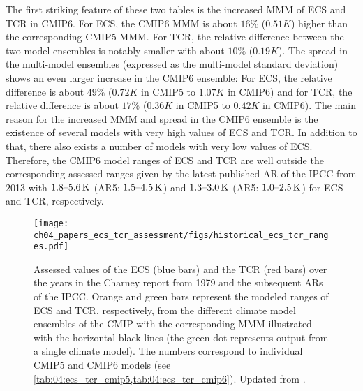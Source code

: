 The first striking feature of these two tables is the increased \ac{MMM} of
\ac{ECS} and \ac{TCR} in \acs{CMIP}6. For \ac{ECS}, the \acs{CMIP}6 \ac{MMM} is
about $16 \unit{\%}$ ($0.51 \unit{K}$) higher than the corresponding
\acs{CMIP}5 \ac{MMM}. For \ac{TCR}, the relative difference between the two
model ensembles is notably smaller with about $10 \unit{\%}$ ($0.19 \unit{K}$).
The spread in the multi-model ensembles (expressed as the multi-model standard
deviation) shows an even larger increase in the \acs{CMIP}6 ensemble: For
\ac{ECS}, the relative difference is about $49 \unit{\%}$ ($0.72 \unit{K}$ in
\acs{CMIP}5 to $1.07 \unit{K}$ in \acs{CMIP}6) and for \ac{TCR}, the relative
difference is about $17 \unit{\%}$ ($0.36 \unit{K}$ in \acs{CMIP}5 to $0.42
\unit{K}$ in \acs{CMIP}6). The main reason for the increased \ac{MMM} and
spread in the \acs{CMIP}6 ensemble is the existence of several models with very
high values of \ac{ECS} and \ac{TCR}. In addition to that, there also exists a
number of models with very low values of \ac{ECS}. Therefore, the \ac{CMIP}6
model ranges of \ac{ECS} and \ac{TCR} are well outside the corresponding
assessed ranges given by the latest published \acl{AR} of the \ac{IPCC} from
2013 \autocite{Stocker2013} with $\range{1.8}{5.6} \unit{K}$ (\acs{AR}5:
$\range{1.5}{4.5} \unit{K}$) and  $\range{1.3}{3.0} \unit{K}$ (\acs{AR}5:
$\range{1.0}{2.5} \unit{K}$) for \ac{ECS} and \ac{TCR}, respectively.

\begin{figure}[t]
  \centering
  \texttt{[image: 
    ch04\_papers\_ecs\_tcr\_assessment/figs/historical\_ecs\_tcr\_ranges.pdf]}
  \caption{Assessed values of the \acf{ECS} (blue bars) and the \acf{TCR} (red
    bars) over the years in the Charney report from 1979 \autocite{Charney1979}
    and the subsequent \acp{AR} of the \acf{IPCC}. Orange and green bars
    represent the modeled ranges of \acs{ECS} and \acs{TCR}, respectively, from
    the different climate model ensembles of the \acf{CMIP} with the
    corresponding \acf{MMM} illustrated with the horizontal black lines (the
    green dot represents output from a single climate model). The numbers
    correspond to individual \acs{CMIP}5 and \acs{CMIP}6 models (see
    \cref{tab:04:ecs_tcr_cmip5,tab:04:ecs_tcr_cmip6}). Updated from
    \textcite{Meehl2020}.}
  \label{fig:04:historical_ecs_tcr_ranges}
\end{figure}

